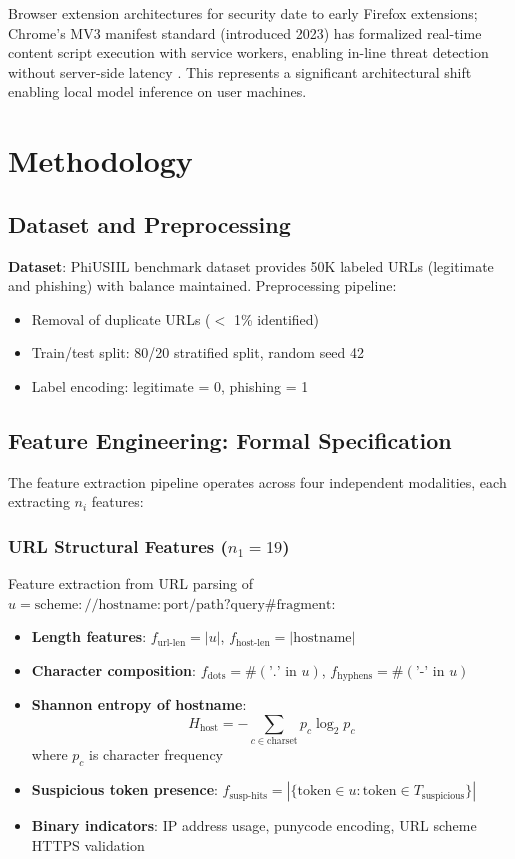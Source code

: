 \documentclass[conference]{IEEEtran}
\begin{document}
Browser extension architectures for security date to early Firefox extensions; Chrome's MV3 manifest standard (introduced 2023) has formalized real-time content script execution with service workers, enabling in-line threat detection without server-side latency \cite{b20}. This represents a significant architectural shift enabling local model inference on user machines.

\section{Methodology}

\subsection{Dataset and Preprocessing}

\textbf{Dataset}: PhiUSIIL benchmark dataset provides 50K labeled URLs (legitimate and phishing) with balance maintained. Preprocessing pipeline:
\begin{itemize}
\item Removal of duplicate URLs ($<$ 1\% identified)
\item Train/test split: 80/20 stratified split, random seed 42
\item Label encoding: legitimate = 0, phishing = 1
\end{itemize}

\subsection{Feature Engineering: Formal Specification}

The feature extraction pipeline operates across four independent modalities, each extracting $n_i$ features:

\subsubsection{URL Structural Features ($n_1 = 19$)}

Feature extraction from URL parsing of $u = \text{scheme}://\text{hostname}:\text{port}/\text{path}?\text{query}\#\text{fragment}$:

\begin{itemize}
\item \textbf{Length features}: $f_{\text{url-len}} = |u|$, $f_{\text{host-len}} = |\text{hostname}|$
\item \textbf{Character composition}: $f_{\text{dots}} = \#(\text{'.' in } u)$, $f_{\text{hyphens}} = \#(\text{'-' in } u)$
\item \textbf{Shannon entropy of hostname}:
\[
H_{\text{host}} = -\sum_{c \in \text{charset}} p_c \log_2 p_c
\]
where $p_c$ is character frequency \cite{b21}
\item \textbf{Suspicious token presence}: $f_{\text{susp-hits}} = |\{\text{token} \in u : \text{token} \in T_{\text{suspicious}}\}|$
\item \textbf{Binary indicators}: IP address usage, punycode encoding, URL scheme HTTPS validation
\end{itemize}
\end{document}

